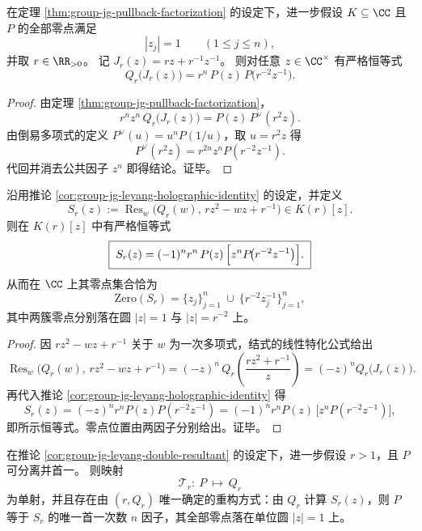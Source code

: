 \begin{corollary}\label{cor:group-jg-leyang-holographic-identity}
在定理 \ref{thm:group-jg-pullback-factorization} 的设定下，进一步假设 \(K\subseteq\CC\) 且 \(P\) 的全部零点满足
\[
|z_j|=1\qquad(1\le j\le n),
\]
并取 \(r\in\RR_{>0}\)。
记 \(J_r(z)=r z+r^{-1}z^{-1}\)。
则对任意 \(z\in\CC^\times\) 有严格恒等式
\[
\boxed{\;
Q_r\!\bigl(J_r(z)\bigr)=r^{n}\,P(z)\,P\!\bigl(r^{-2}z^{-1}\bigr).
\;}
\]
\end{corollary}

\begin{proof}
由定理 \ref{thm:group-jg-pullback-factorization}，
\[
r^n z^n\,Q_r\!\bigl(J_r(z)\bigr)=P(z)\,P^{\vee}(r^2 z).
\]
由倒易多项式的定义 \(P^{\vee}(u)=u^n P(1/u)\)，取 \(u=r^2 z\) 得
\[
P^{\vee}(r^2 z)=r^{2n}z^n P(r^{-2}z^{-1}).
\]
代回并消去公共因子 \(z^n\) 即得结论。证毕。
\end{proof}

\begin{corollary}[双结式消元与同心圆双谱]\label{cor:group-jg-leyang-double-resultant}
沿用推论 \ref{cor:group-jg-leyang-holographic-identity} 的设定，并定义
\[
S_r(z):=\operatorname{Res}_w\!\bigl(Q_r(w),\,r z^2-w z+r^{-1}\bigr)\in K(r)[z].
\]
则在 \(K(r)[z]\) 中有严格恒等式
\[
\boxed{\;
S_r(z)=(-1)^n r^{n}\,P(z)\,\Bigl[z^{n}P\!\bigl(r^{-2}z^{-1}\bigr)\Bigr].
\;}
\]
从而在 \(\CC\) 上其零点集合恰为
\[
\mathrm{Zero}(S_r)
=\{z_j\}_{j=1}^n\ \cup\ \{r^{-2}z_j^{-1}\}_{j=1}^n,
\]
其中两簇零点分别落在圆 \(|z|=1\) 与 \(|z|=r^{-2}\) 上。
\end{corollary}

\begin{proof}
因 \(r z^2-w z+r^{-1}\) 关于 \(w\) 为一次多项式，结式的线性特化公式给出
\[
\operatorname{Res}_w\!\bigl(Q_r(w),\,r z^2-w z+r^{-1}\bigr)
=(-z)^n\,Q_r\!\left(\frac{r z^2+r^{-1}}{z}\right)
=(-z)^n Q_r\!\bigl(J_r(z)\bigr).
\]
再代入推论 \ref{cor:group-jg-leyang-holographic-identity} 得
\[
S_r(z)=(-z)^n r^{n}P(z)P(r^{-2}z^{-1})
=(-1)^n r^{n}P(z)\,\bigl[z^nP(r^{-2}z^{-1})\bigr],
\]
即所示恒等式。零点位置由两因子分别给出。证毕。
\end{proof}

\begin{corollary}[单尺度椭圆输运的可逆性与全息重构]\label{cor:group-jg-leyang-single-scale-reconstruction}
在推论 \ref{cor:group-jg-leyang-double-resultant} 的设定下，进一步假设 \(r>1\)，且 \(P\) 可分离并首一。
则映射
\[
\mathcal{T}_r:\ P\ \longmapsto\ Q_r
\]
为单射，并且存在由 \((r,Q_r)\) 唯一确定的重构方式：由 \(Q_r\) 计算 \(S_r(z)\)，则 \(P\) 等于 \(S_r\) 的唯一首一次数 \(n\) 因子，其全部零点落在单位圆 \(|z|=1\) 上。
\end{corollary}

